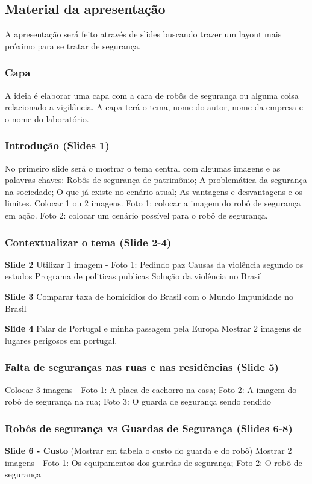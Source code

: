 \documentclass[12pt,a4paper]{article}
\begin{document}
    \subsection{Material da apresentação}
    A apresentação será feito através de slides buscando trazer um layout mais próximo para se tratar de segurança.

    \subsubsection{Capa}
    A ideia é elaborar uma capa com a cara de robôs de segurança ou alguma coisa relacionado a vigilância. A capa terá o tema, nome do autor, nome da empresa e o nome do laboratório.

    \subsubsection{Introdução (Slides 1)}
    No primeiro slide será o mostrar o tema central com algumas imagens e as palavras chaves: Robôs de segurança de patrimônio; A problemática da segurança na sociedade;  O que já existe no cenário atual; As vantagens e desvantagens e os limites. Colocar 1 ou 2 imagens. Foto 1: colocar a imagem do robô de segurança em ação. Foto 2: colocar um cenário possível para o robô de segurança. 

    \subsubsection{Contextualizar o tema (Slide 2-4)}
    \textbf{Slide 2}
    Utilizar 1 imagem - Foto 1: Pedindo paz 
    Causas da violência segundo os estudos
    Programa de politicas publicas
    Solução da violência no Brasil
    
    \textbf{Slide 3}
    Comparar taxa de homicídios do Brasil com o Mundo
    Impunidade no Brasil
    
    \textbf{Slide 4}
    Falar de Portugal e minha passagem pela Europa
    Mostrar 2 imagens de lugares perigosos em portugal.

    \subsubsection{Falta de seguranças nas ruas e nas residências (Slide 5)}
    Colocar 3 imagens - Foto 1: A placa de cachorro na casa; Foto 2: A imagem do robô de segurança na rua; Foto 3: O guarda de segurança sendo rendido 

    \subsubsection{Robôs de segurança vs Guardas de Segurança (Slides 6-8)}
    \textbf{Slide 6 - Custo}
    (Mostrar em tabela o custo do guarda e do robô)
    Mostrar 2 imagens - Foto 1: Os equipamentos dos guardas de segurança; Foto 2: O robô de segurança
\end{document}
